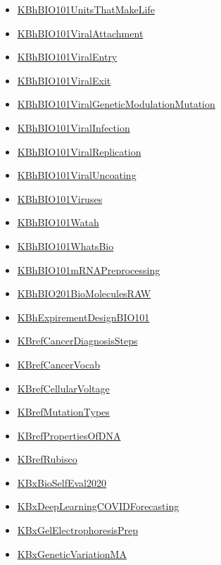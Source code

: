 \documentclass[11pt]{article}
\begin{document}
\begin{itemize}
\begin{itemize}
\item \href{bio101/KBhBIO101UnitsThatMakeLife.org}{KBhBIO101UnitsThatMakeLife}
\item \href{bio101/KBhBIO101ViralAttachment.org}{KBhBIO101ViralAttachment}
\item \href{bio101/KBhBIO101ViralEntry.org}{KBhBIO101ViralEntry}
\item \href{bio101/KBhBIO101ViralExit.org}{KBhBIO101ViralExit}
\item \href{bio101/KBhBIO101ViralGeneticModulationMutation.org}{KBhBIO101ViralGeneticModulationMutation}
\item \href{bio101/KBhBIO101ViralInfection.org}{KBhBIO101ViralInfection}
\item \href{bio101/KBhBIO101ViralReplication.org}{KBhBIO101ViralReplication}
\item \href{bio101/KBhBIO101ViralUncoating.org}{KBhBIO101ViralUncoating}
\item \href{bio101/KBhBIO101Viruses.org}{KBhBIO101Viruses}
\item \href{bio101/KBhBIO101Watah.org}{KBhBIO101Watah}
\item \href{bio101/KBhBIO101WhatsBio.org}{KBhBIO101WhatsBio}
\item \href{bio101/KBhBIO101mRNAPreprocessing.org}{KBhBIO101mRNAPreprocessing}
\item \href{bio101/KBhBIO201BioMoleculesRAW.org}{KBhBIO201BioMoleculesRAW}
\item \href{bio101/KBhExpirementDesignBIO101.org}{KBhExpirementDesignBIO101}
\item \href{bio101/KBrefCancerDiagnosisSteps.org}{KBrefCancerDiagnosisSteps}
\item \href{bio101/KBrefCancerVocab.org}{KBrefCancerVocab}
\item \href{bio101/KBrefCellularVoltage.org}{KBrefCellularVoltage}
\item \href{bio101/KBrefMutationTypes.org}{KBrefMutationTypes}
\item \href{bio101/KBrefPropertiesOfDNA.org}{KBrefPropertiesOfDNA}
\item \href{bio101/KBrefRubisco.org}{KBrefRubisco}
\item \href{bio101/KBxBioSelfEval2020.org}{KBxBioSelfEval2020}
\item \href{bio101/KBxDeepLearningCOVIDForecasting.org}{KBxDeepLearningCOVIDForecasting}
\item \href{bio101/KBxGelElectrophoresisPrep.org}{KBxGelElectrophoresisPrep}
\item \href{bio101/KBxGeneticVariationMA.org}{KBxGeneticVariationMA}

\end{itemize}
\end{itemize}
\end{document}
